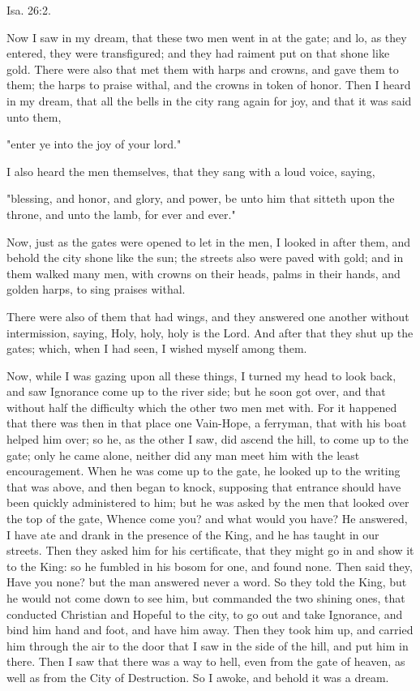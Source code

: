 Isa. 26:2.

Now I saw in my dream, that these two men went in at the gate; and lo,
as they entered, they were transfigured; and they had raiment put on
that shone like gold. There were also that met them with harps and
crowns, and gave them to them; the harps to praise withal, and the
crowns in token of honor. Then I heard in my dream, that all the bells
in the city rang again for joy, and that it was said unto them,

"enter ye into the joy of your lord."

I also heard the men themselves, that they sang with a loud voice,
saying,

"blessing, and honor, and glory, and power, be unto him that sitteth
upon the throne, and unto the lamb, for ever and ever."

Now, just as the gates were opened to let in the men, I looked in after
them, and behold the city shone like the sun; the streets also were
paved with gold; and in them walked many men, with crowns on their
heads, palms in their hands, and golden harps, to sing praises withal.

There were also of them that had wings, and they answered one another
without intermission, saying, Holy, holy, holy is the Lord. And after
that they shut up the gates; which, when I had seen, I wished myself
among them.

Now, while I was gazing upon all these things, I turned my head to look
back, and saw Ignorance come up to the river side; but he soon got
over, and that without half the difficulty which the other two men met
with. For it happened that there was then in that place one Vain-Hope,
a ferryman, that with his boat helped him over; so he, as the other I
saw, did ascend the hill, to come up to the gate; only he came alone,
neither did any man meet him with the least encouragement. When he was
come up to the gate, he looked up to the writing that was above, and
then began to knock, supposing that entrance should have been quickly
administered to him; but he was asked by the men that looked over the
top of the gate, Whence come you? and what would you have? He answered,
I have ate and drank in the presence of the King, and he has taught in
our streets. Then they asked him for his certificate, that they might
go in and show it to the King: so he fumbled in his bosom for one, and
found none. Then said they, Have you none? but the man answered never a
word. So they told the King, but he would not come down to see him, but
commanded the two shining ones, that conducted Christian and Hopeful to
the city, to go out and take Ignorance, and bind him hand and foot, and
have him away. Then they took him up, and carried him through the air
to the door that I saw in the side of the hill, and put him in there.
Then I saw that there was a way to hell, even from the gate of heaven,
as well as from the City of Destruction. So I awoke, and behold it was
a dream.
